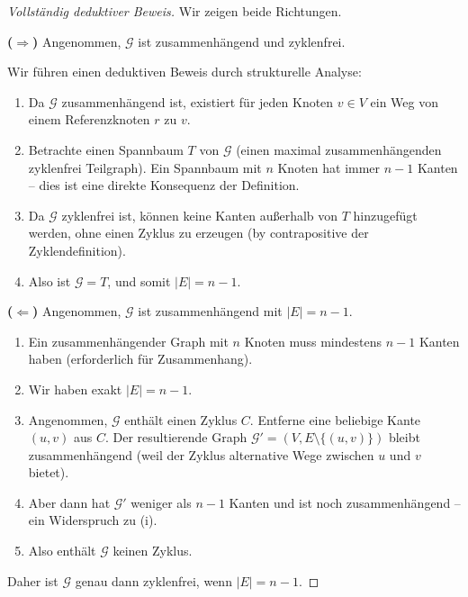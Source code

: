 \documentclass[12pt, a4paper]{article}
\theoremstyle{definition}
\theoremstyle{remark}
\newcommand{\Graph}{\mathcal{G}}
\begin{document}
\begin{proof}[Vollständig deduktiver Beweis]
Wir zeigen beide Richtungen.

\textbf{($\Rightarrow$)} Angenommen, $\Graph$ ist zusammenhängend und zyklenfrei.

Wir führen einen deduktiven Beweis durch strukturelle Analyse:

\begin{enumerate}[label=(\roman*)]
  \item Da $\Graph$ zusammenhängend ist, existiert für jeden Knoten $v \in V$ ein Weg von einem Referenzknoten $r$ zu $v$.
  
  \item Betrachte einen Spannbaum $T$ von $\Graph$ (einen maximal zusammenhängenden zyklenfrei Teilgraph). Ein Spannbaum mit $n$ Knoten hat immer $n-1$ Kanten -- dies ist eine direkte Konsequenz der Definition.
  
  \item Da $\Graph$ zyklenfrei ist, können keine Kanten außerhalb von $T$ hinzugefügt werden, ohne einen Zyklus zu erzeugen (by contrapositive der Zyklendefinition).
  
  \item Also ist $\Graph = T$, und somit $|E| = n - 1$.
\end{enumerate}

\textbf{($\Leftarrow$)} Angenommen, $\Graph$ ist zusammenhängend mit $|E| = n-1$.

\begin{enumerate}[label=(\roman*)]
  \item Ein zusammenhängender Graph mit $n$ Knoten muss mindestens $n-1$ Kanten haben (erforderlich für Zusammenhang).
  
  \item Wir haben exakt $|E| = n-1$. 
  
  \item Angenommen, $\Graph$ enthält einen Zyklus $C$. Entferne eine beliebige Kante $(u, v)$ aus $C$. Der resultierende Graph $\Graph' = (V, E \setminus \{(u,v)\})$ bleibt zusammenhängend (weil der Zyklus alternative Wege zwischen $u$ und $v$ bietet).
  
  \item Aber dann hat $\Graph'$ weniger als $n-1$ Kanten und ist noch zusammenhängend -- ein Widerspruch zu (i).
  
  \item Also enthält $\Graph$ keinen Zyklus.
\end{enumerate}

Daher ist $\Graph$ genau dann zyklenfrei, wenn $|E| = n-1$.
\end{proof}
\end{document}
